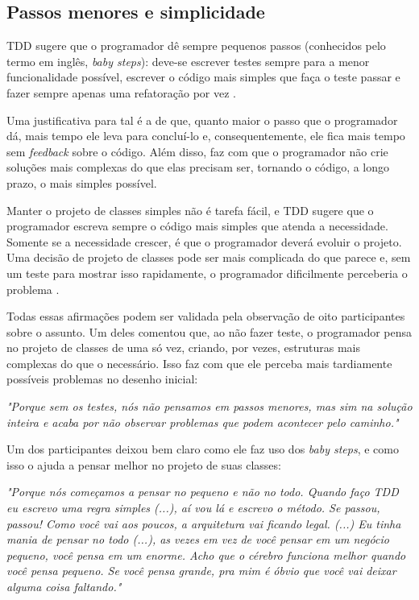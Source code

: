 \subsection{Passos menores e simplicidade}

TDD sugere que o programador dê sempre pequenos passos (conhecidos pelo termo em
inglês, \textit{baby steps}): deve-se escrever testes sempre para a menor
funcionalidade possível, escrever o código mais simples que faça o teste passar
e fazer sempre apenas uma refatoração por vez \cite{TDDByExample}.

Uma justificativa para tal é a de que, quanto maior o passo que o programador dá, mais
tempo ele leva para concluí-lo e, consequentemente, ele fica mais tempo
sem \textit{feedback} sobre o código. Além disso, faz com que o programador não crie
soluções mais complexas do que elas precisam ser, tornando o código, a longo
prazo, o mais simples possível.

Manter o projeto de classes simples não é tarefa fácil, e TDD sugere que o programador
escreva sempre o código mais simples que atenda a necessidade. Somente se a
necessidade crescer, é que o programador deverá evoluir o projeto. Uma decisão de
projeto de classes pode ser mais complicada do que parece e, sem um teste para mostrar isso
rapidamente, o programador dificilmente perceberia o problema \cite{aim-fire}.

Todas essas afirmações podem ser validada pela observação de oito participantes sobre o assunto.
Um deles comentou que,
ao não fazer teste, o programador pensa no projeto de classes de uma só vez, criando, por vezes,
estruturas mais complexas do que o necessário. Isso faz com que ele perceba mais tardiamente
possíveis problemas no desenho inicial:

\begin{framed}
\textit{"Porque sem os testes, nós não pensamos em passos menores, mas sim na solução inteira
e acaba por não observar problemas que podem acontecer pelo caminho."}
\end{framed}

Um dos participantes deixou bem claro como ele faz uso dos \textit{baby steps}, e como
isso o ajuda a pensar melhor no projeto de suas classes:

\begin{framed}
\textit{"Porque nós começamos a pensar no pequeno e não no todo. Quando faço TDD eu escrevo
uma regra simples (...), aí vou lá e escrevo o método. Se passou, passou! Como você vai aos poucos,
a arquitetura vai ficando legal. (...) Eu tinha mania de pensar no todo (...), as vezes
em vez de você pensar em um negócio pequeno, você pensa em um enorme. Acho que o cérebro funciona
melhor quando você pensa pequeno. Se você pensa grande, pra mim é óbvio que você vai deixar
alguma coisa faltando."}
\end{framed}

